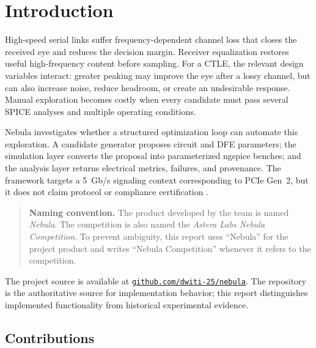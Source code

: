 \chapter{Introduction}

High-speed serial links suffer frequency-dependent channel loss that closes the
received eye and reduces the decision margin. Receiver equalization restores
useful high-frequency content before sampling. For a CTLE, the relevant design
variables interact: greater peaking may improve the eye after a lossy channel,
but can also increase noise, reduce headroom, or create an undesirable response.
Manual exploration becomes costly when every candidate must pass several SPICE
analyses and multiple operating conditions.

Nebula investigates whether a structured optimization loop can automate this
exploration. A candidate generator proposes circuit and DFE parameters; the
simulation layer converts the proposal into parameterized ngspice benches; and
the analysis layer returns electrical metrics, failures, and provenance. The
framework targets a \SI{5}{Gb/s} signaling context corresponding to PCIe Gen~2,
but it does not claim protocol or compliance certification \citep{pcieOverview}.

\begin{quote}
\textbf{Naming convention.} The product developed by the team is named
\emph{Nebula}. The competition is also named the \emph{Astera Labs Nebula
Competition}. To prevent ambiguity, this report uses ``Nebula'' for the project
product and writes ``Nebula Competition'' whenever it refers to the competition.
\end{quote}

The project source is available at
\href{\projecturl}{\texttt{github.com/dwiti-25/nebula}}. The repository is the
authoritative source for implementation behavior; this report distinguishes
implemented functionality from historical experimental evidence.

\section{Contributions}

